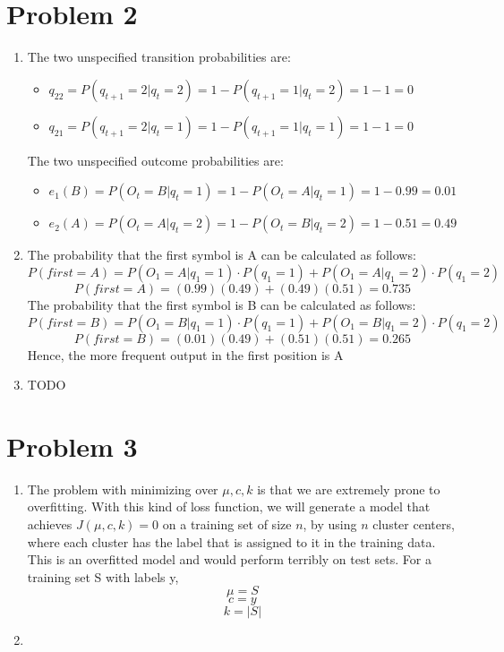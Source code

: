 \documentclass[11pt]{article}
\newcommand{\solution}[1]{{{\color{blue}{\bf Solution:} {#1}}}}
\begin{document}
\section{Problem 2}
\begin{enumerate}
\item \solution{} \newline
The two unspecified transition probabilities are: 
\begin{itemize}
	\item $q_{22} = P(q_{t+1} = 2 | q_t = 2) = 1 - P(q_{t+1} = 1 | q_t = 2) = 1 - 1 = 0$
	\item $q_{21} = P(q_{t+1} = 2 | q_t = 1) = 1 - P(q_{t+1} = 1 | q_t = 1) = 1 - 1 = 0$
\end{itemize}
The two unspecified outcome probabilities are:
\begin{itemize}
	\item $e_1 (B) = P(O_t = B | q_t = 1) = 1 - P(O_t = A | q_t = 1) = 1 - 0.99 = 0.01$
	\item $e_2 (A) = P(O_t = A | q_t = 2) = 1 - P(O_t = B | q_t = 2) = 1 - 0.51 = 0.49$ 
\end{itemize}

\item \solution{} \newline
The probability that the first symbol is A can be calculated as follows:
$$
P(first = A) = P(O_1 = A | q_1 = 1) \cdot P(q_1 = 1) + P(O_1 = A | q_1 = 2) \cdot P(q_1 = 2)
$$
$$
P(first = A) = (0.99) (0.49) + (0.49) (0.51) = 0.735
$$
The probability that the first symbol is B can be calculated as follows:
$$
P(first = B) = P(O_1 = B | q_1 = 1) \cdot P(q_1 = 1) + P(O_1 = B | q_1 = 2) \cdot P(q_1 = 2)
$$
$$
P(first = B) = (0.01) (0.49) + (0.51) (0.51) = 0.265
$$
Hence, the more frequent output in the first position is A

\item \solution{} \newline
TODO
\end{enumerate}

\newpage
\section{Problem 3}
\begin{enumerate}
\item 
The problem with minimizing over $\mu, c, k$ is that we are extremely prone to overfitting. With this kind of
loss function, we will generate a model that achieves $J(\mu, c, k) = 0$ on a training set of size $n$, by 
using $n$ cluster centers, where each cluster has the label that is assigned to it in the training data. This
is an overfitted model and would perform terribly on test sets. \newline
For a training set S with labels y, \newline
$$\mu = S$$
$$c = y$$
$$k = |S|$$
\item 

\end{enumerate}
\end{document}
